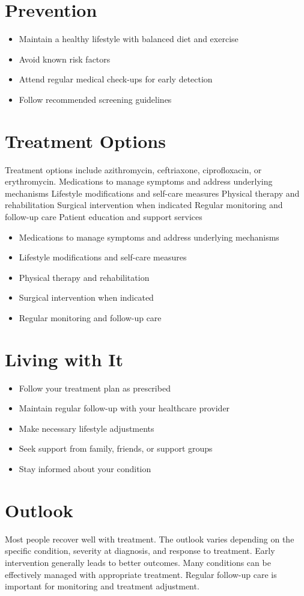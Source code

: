 \section{Prevention}
\begin{itemize}[noitemsep]
  \item Maintain a healthy lifestyle with balanced diet and exercise
  \item Avoid known risk factors
  \item Attend regular medical check-ups for early detection
  \item Follow recommended screening guidelines
\end{itemize}
\section{Treatment Options}
Treatment options include azithromycin, ceftriaxone, ciprofloxacin, or erythromycin. Medications to manage symptoms and address underlying mechanisms Lifestyle modifications and self-care measures Physical therapy and rehabilitation Surgical intervention when indicated Regular monitoring and follow-up care Patient education and support services

\begin{itemize}[noitemsep]
  \item Medications to manage symptoms and address underlying mechanisms
  \item Lifestyle modifications and self-care measures
  \item Physical therapy and rehabilitation
  \item Surgical intervention when indicated
  \item Regular monitoring and follow-up care
\end{itemize}
\section{Living with It}
\begin{itemize}[noitemsep]
  \item Follow your treatment plan as prescribed
  \item Maintain regular follow-up with your healthcare provider
  \item Make necessary lifestyle adjustments
  \item Seek support from family, friends, or support groups
  \item Stay informed about your condition
\end{itemize}
\section{Outlook}
Most people recover well with treatment. The outlook varies depending on the specific condition, severity at diagnosis, and response to treatment. Early intervention generally leads to better outcomes. Many conditions can be effectively managed with appropriate treatment. Regular follow-up care is important for monitoring and treatment adjustment.
